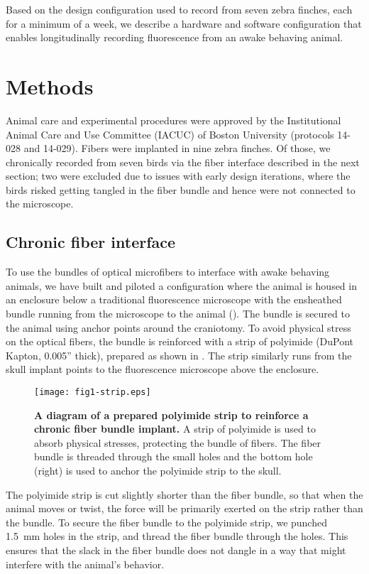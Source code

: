 Based on the design configuration used to record from 
seven zebra finches, each for a minimum of a week, we 
describe a hardware and software configuration that 
enables longitudinally recording fluorescence  
from an awake behaving animal.

\section{Methods}

Animal care and experimental procedures were 
approved by the Institutional Animal Care and Use Committee (IACUC) 
of Boston University (protocols 14-028 and 14-029). Fibers were 
implanted in nine zebra finches. Of those, we chronically recorded 
from seven birds via the fiber interface described in the next section; 
two were excluded due to issues with early design iterations, 
where the birds risked getting tangled in the fiber bundle and hence 
were not connected to the microscope.

\subsection{Chronic fiber interface}

To use the bundles of optical microfibers to interface 
with awake behaving animals, we have built and piloted 
a configuration where the animal is housed in an enclosure 
below a traditional fluorescence microscope with the 
ensheathed bundle running from the microscope to 
the animal (). The bundle is secured to the animal using 
anchor points around the craniotomy. To avoid physical 
stress on the optical fibers, the bundle is reinforced 
with a strip of polyimide (DuPont Kapton, 0.005'' thick),
prepared as shown in . The strip 
similarly runs from the skull implant points to the 
fluorescence microscope above the enclosure.

\begin{figure}
\texttt{[image: fig1-strip.eps]}
\caption[Polyimide to reinforce fiber bundle]{\textbf{A diagram
of a prepared polyimide strip to reinforce a chronic fiber 
bundle implant.} A strip of polyimide is used to absorb physical 
stresses, protecting the bundle of fibers. The fiber bundle is 
threaded through the small holes and the bottom hole (right) is 
used to anchor the polyimide strip to the skull.}
\label{fig:strip}
\end{figure}

The polyimide strip is cut slightly shorter than the fiber 
bundle, so that when the animal moves or twist, the force 
will be primarily exerted on the strip rather than the bundle.
To secure the fiber bundle to the polyimide strip, we 
punched 1.5~mm holes in the strip, and thread the fiber 
bundle through the holes. This ensures that the slack 
in the fiber bundle does not dangle in a way that might 
interfere with the animal's behavior.

